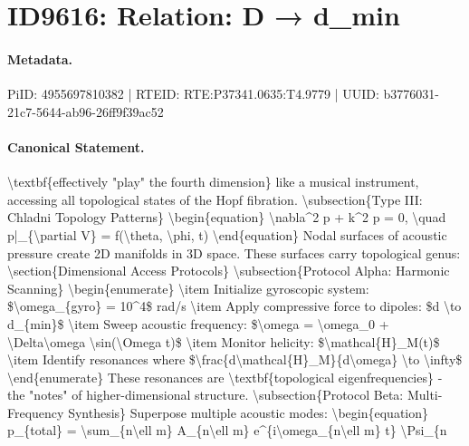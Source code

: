 \section*{ID9616: Relation: D → d\_min}
\paragraph{Metadata.}
PiID: 4955697810382 | RTEID: RTE:P37341.0635:T4.9779 | UUID: b3776031-21c7-5644-ab96-26ff9f39ac52

\paragraph{Canonical Statement.}
\textbackslash{}textbf\{effectively "play" the fourth dimension\} like a musical instrument, accessing all topological states of the Hopf fibration. \textbackslash{}subsection\{Type III: Chladni Topology Patterns\} \textbackslash{}begin\{equation\} \textbackslash{}nabla\textasciicircum{}2 p + k\textasciicircum{}2 p = 0, \textbackslash{}quad p|\_\{\textbackslash{}partial V\} = f(\textbackslash{}theta, \textbackslash{}phi, t) \textbackslash{}end\{equation\} Nodal surfaces of acoustic pressure create 2D manifolds in 3D space. These surfaces carry topological genus: \textbackslash{}section\{Dimensional Access Protocols\} \textbackslash{}subsection\{Protocol Alpha: Harmonic Scanning\} \textbackslash{}begin\{enumerate\} \textbackslash{}item Initialize gyroscopic system: \$\textbackslash{}omega\_\{gyro\} = 10\textasciicircum{}4\$ rad/s \textbackslash{}item Apply compressive force to dipoles: \$d \textbackslash{}to d\_\{min\}\$ \textbackslash{}item Sweep acoustic frequency: \$\textbackslash{}omega = \textbackslash{}omega\_0 + \textbackslash{}Delta\textbackslash{}omega \textbackslash{}sin(\textbackslash{}Omega t)\$ \textbackslash{}item Monitor helicity: \$\textbackslash{}mathcal\{H\}\_M(t)\$ \textbackslash{}item Identify resonances where \$\textbackslash{}frac\{d\textbackslash{}mathcal\{H\}\_M\}\{d\textbackslash{}omega\} \textbackslash{}to \textbackslash{}infty\$ \textbackslash{}end\{enumerate\} These resonances are \textbackslash{}textbf\{topological eigenfrequencies\} - the "notes" of higher-dimensional structure. \textbackslash{}subsection\{Protocol Beta: Multi-Frequency Synthesis\} Superpose multiple acoustic modes: \textbackslash{}begin\{equation\} p\_\{total\} = \textbackslash{}sum\_\{n\textbackslash{}ell m\} A\_\{n\textbackslash{}ell m\} e\textasciicircum{}\{i\textbackslash{}omega\_\{n\textbackslash{}ell m\} t\} \textbackslash{}Psi\_\{n

